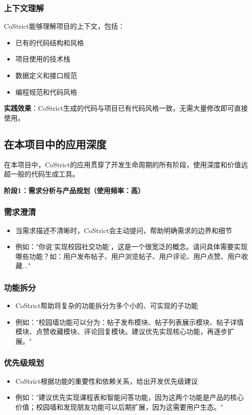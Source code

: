 ﻿\documentclass[12pt,a4paper]{article}
\begin{document}
\subsubsection{上下文理解}

CoStrict能够理解项目的上下文，包括：
\begin{itemize}
    \item 已有的代码结构和风格
    \item 项目使用的技术栈
    \item 数据定义和接口规范
    \item 编程规范和代码风格
\end{itemize}

\textbf{实践效果}：CoStrict生成的代码与项目已有代码风格一致，无需大量修改即可直接使用。

\subsection{在本项目中的应用深度}

在本项目中，CoStrict的应用贯穿了开发生命周期的所有阶段，使用深度和价值远超一般的代码生成工具。

\textbf{阶段1：需求分析与产品规划（使用频率：高）}

\subsubsection{需求澄清}
\begin{itemize}
    \item 当需求描述不清晰时，CoStrict会主动提问，帮助明确需求的边界和细节
    \item 例如："你说'实现校园社交功能'，这是一个很宽泛的概念。请问具体需要实现哪些功能？如：用户发布帖子、用户浏览帖子、用户评论、用户点赞、用户收藏..."
\end{itemize}

\subsubsection{功能拆分}
\begin{itemize}
    \item CoStrict帮助将复杂的功能拆分为多个小的、可实现的子功能
    \item 例如："校园墙功能可以分为：帖子发布模块、帖子列表展示模块、帖子详情模块、点赞收藏模块、评论回复模块。建议优先实现核心功能，再逐步扩展。"
\end{itemize}

\subsubsection{优先级规划}
\begin{itemize}
    \item CoStrict根据功能的重要性和依赖关系，给出开发优先级建议
    \item 例如："建议优先实现课程表和智能问答功能，因为这两个功能是产品的核心价值；校园墙和发现朋友功能可以后期扩展，因为这需要用户生态。"
\end{itemize}
\end{document}
